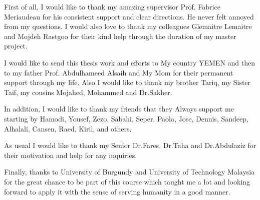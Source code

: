 First of all, I would like to thank my amazing supervisor Prof. Fabrice Meriaudeau for his consistent support and clear directions. He never felt annoyed from my questions.
I would also love to thank my colleagues Glemaitre Lemaitre and Mojdeh Rastgoo for their kind help through the duration of my master project.

I would like to send this thesis work and efforts to My country YEMEN and then to my father Prof. Abdulhameed Alsaih and My Mom for their permanent support through my life.
Also I would like to thank my brother Tariq, my Sister Taif, my cousins Mojahed, Mohammed and Dr.Sakher. 

In addition, I would like to thank my friends that they Always support me starting by Hamodi, Yousef, Zezo, Sabahi, Seper, Paola, Jose, Dennis, Sandeep, Alhalali, Cansen, Raed, Kiril, and others.

As usual I would like to thank my Senior Dr.Fares, Dr.Taha and Dr.Abdulaziz for their motivation and help for any inquiries.   

Finally, thanks to University of Burgundy and University of Technology Malaysia for the great chance to be part of this course which taught me a lot and looking forward to apply it with the sense of serving humanity in a good manner.

\pagestyle{fancy}



